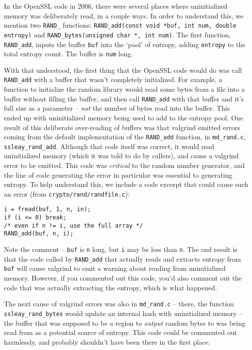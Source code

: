 \documentclass[conference]{IEEEtran}
\begin{document}
In the OpenSSL code in 2006, there were several places where
uninitialized memory was deliberately read, in a couple ways. In order
to understand this, we mention two \verb|RAND_| functions:
\verb|RAND_add(const void *buf, int num, double entropy)| and
\verb|RAND_bytes(unsigned char *, int num)|. The first function,
\verb|RAND_add|, inputs the buffer \verb|buf| into the `pool' of
entropy, adding \verb|entropy| to the total entropy count. The buffer
is \verb|num| long.

With that understood, the first thing that the OpenSSL code would do
was call \verb|RAND_add| with a buffer that wasn't completely
initialized\cite{3}. For example, a function to initialize the random
library would read some bytes from a file into a buffer without
filling the buffer, and then call \verb|RAND_add| with that buffer and
it's full size as a parameter -- \emph{not} the number of bytes read
into the buffer. This ended up with uninitialized memory being used to
add to the entropy pool. One result of this deliberate over-reading of
buffers was that valgrind emitted errors coming from the default
implementation of the \verb|RAND_add| function, in \verb|md_rand.c|,
\verb|ssleay_rand_add|. Although that code itself was correct, it
would read uninitialized memory (which it was told to do by callers),
and cause a valgrind error to be emitted. This code was
\emph{critical} to the random number generator, and the line of code
generating the error in particular was essential to generating
entropy. To help understand this, we include a code excerpt that could
cause such an error (from \verb|crypto/rand/randfile.c|):

\begin{verbatim}
i = fread(buf, 1, n, in);
if (i <= 0) break;
/* even if n != i, use the full array */
RAND_add(buf, n, i);
\end{verbatim}

Note the comment -- \verb|buf| is \verb|n| long, but \verb|i| may be
less than \verb|n|. The end result is that the code called by
\verb|RAND_add| that actually reads and extracts entropy from
\verb|buf| will cause valgrind to emit a warning about reading from
uninitialized memory. However, if you commented out this code, you'd
also comment out the code that was actually extracting the entropy,
which is what happened.

The next cause of valgrind errors was also in
\verb|md_rand.c| -- there, the function \verb|ssleay_rand_bytes| would
update an internal hash with uninitialized memory -- the buffer that
was supposed to be a region to \emph{output} random bytes to was being
read from as a potential source of entropy. This code could be
commented out harmlessly, and probably shouldn't have been there in
the first place.
\end{document}
